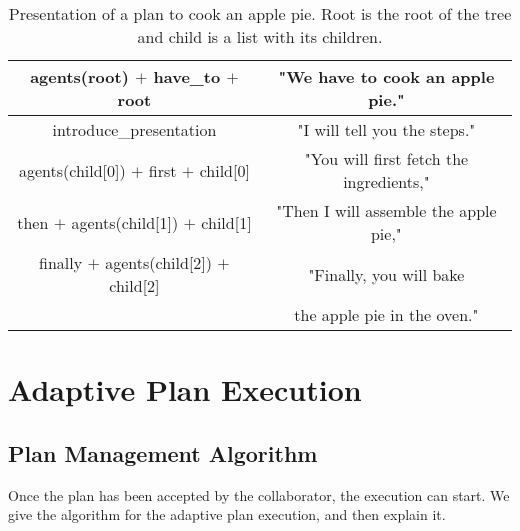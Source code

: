  
 
 \begin{table}
\centering
\scriptsize
\renewcommand{\arraystretch}{1.3}
\begin{tabular}{c|c}
   agents(root) $+$ have\_to $+$ root  & "We have to cook an apple pie." \\
   \hline
   introduce\_presentation & "I will tell you the steps." \\
   \hline
   agents(child[0]) $+$ first $+$ child[0] & "You will first fetch the ingredients," \\
   \hline
   then $+$ agents(child[1]) $+$  child[1] & "Then I will assemble the apple pie," \\
   \hline
   finally $+$ agents(child[2]) $+$  child[2] & "Finally, you will bake \\
   & the apple pie in the oven." \\
\end{tabular}
 \vspace{-4pt}
\caption{Presentation of a plan to cook an apple pie. Root is the root of the tree and child is a list with its children.}
 \vspace{-20pt}
 \label{table:pie-present}    
\end{table}
 
\section{Adaptive Plan Execution}
\label{planExecution}

\subsection{Plan Management Algorithm}
\label{sec:algo}
Once the plan has been accepted by the collaborator, the execution can start. We give the algorithm for the adaptive plan execution, and then explain it.



        
